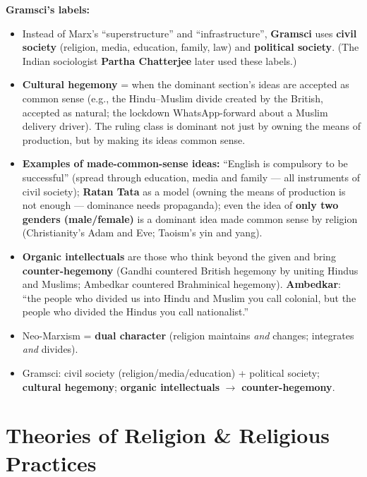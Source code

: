 \begin{DataFact}
\textbf{Gramsci's labels:}
\begin{itemize}
\item Instead of Marx's ``superstructure'' and ``infrastructure'', \textbf{Gramsci} uses \textbf{civil society} (religion, media, education, family, law) and \textbf{political society}. (The Indian sociologist \textbf{Partha Chatterjee} later used these labels.)
\item \textbf{Cultural hegemony} = when the dominant section's ideas are accepted as common sense (e.g., the Hindu--Muslim divide created by the British, accepted as natural; the lockdown WhatsApp-forward about a Muslim delivery driver). The ruling class is dominant not just by owning the means of production, but by making its ideas common sense.
\item \textbf{Examples of made-common-sense ideas:} ``English is compulsory to be successful'' (spread through education, media and family --- all instruments of civil society); \textbf{Ratan Tata} as a model (owning the means of production is not enough --- dominance needs propaganda); even the idea of \textbf{only two genders (male/female)} is a dominant idea made common sense by religion (Christianity's Adam and Eve; Taoism's yin and yang).
\item \textbf{Organic intellectuals} are those who think beyond the given and bring \textbf{counter-hegemony} (Gandhi countered British hegemony by uniting Hindus and Muslims; Ambedkar countered Brahminical hegemony). \textbf{Ambedkar}: ``the people who divided us into Hindu and Muslim you call colonial, but the people who divided the Hindus you call nationalist.''
\end{itemize}
\end{DataFact}

\begin{QuickRevision}
\begin{itemize}
\item Neo-Marxism = \textbf{dual character} (religion maintains \textit{and} changes; integrates \textit{and} divides).
\item Gramsci: civil society (religion/media/education) + political society; \textbf{cultural hegemony}; \textbf{organic intellectuals} $\rightarrow$ \textbf{counter-hegemony}.
\end{itemize}
\end{QuickRevision}

\sectiondivider

\section{Theories of Religion \& Religious Practices}

